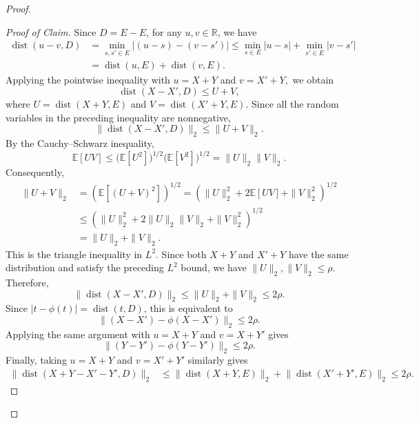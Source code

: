 \documentclass[11pt]{article}
\numberwithin{equation}{section}
\theoremstyle{definition}
\theoremstyle{remark}
\begin{document}
\begin{proof}
\begin{proof}[Proof of Claim]
Since $D=E-E$, for any $u,v\in\mathbb R$, we have
$$
\begin{aligned}
\operatorname{dist}(u-v,D)
&=\min_{s,s'\in E}|(u-s)-(v-s')|\leq
\min_{s\in E}|u-s|+\min_{s'\in E}|v-s'|\\
&=\operatorname{dist}(u,E)+\operatorname{dist}(v,E).
\end{aligned}
$$
Applying the pointwise inequality with
$
u=X+Y
$
and
$
v=X'+Y,
$
we obtain
$$
\operatorname{dist}(X-X',D)\leq U+V,
$$
where
$
U=\operatorname{dist}(X+Y,E)$ and
$V=\operatorname{dist}(X'+Y,E).$
Since all the random variables in the preceding inequality are
nonnegative,
$$
\bigl\|\operatorname{dist}(X-X',D)\bigr\|_2
\leq\|U+V\|_2.
$$
By the Cauchy--Schwarz inequality,
$$
\mathbb E[UV]\leq
\bigl(\mathbb E[U^2]\bigr)^{1/2}
\bigl(\mathbb E[V^2]\bigr)^{1/2}
=\|U\|_2\|V\|_2.
$$
Consequently,
$$
\begin{aligned}
\|U+V\|_2
&=\left(\mathbb E[(U+V)^2]\right)^{1/2}=\left(
\|U\|_2^2+2\mathbb E[UV]+\|V\|_2^2
\right)^{1/2}\\
&\leq
\left(
\|U\|_2^2+2\|U\|_2\|V\|_2+\|V\|_2^2
\right)^{1/2}\\
&=\|U\|_2+\|V\|_2.
\end{aligned}
$$
This is the triangle inequality in $L^2$.
Since both $X+Y$ and $X'+Y$ have the same distribution and satisfy
the preceding $L^2$ bound, we have $\|U\|_2,\|V\|_2\leq\rho$.
Therefore,
$$
\bigl\|\operatorname{dist}(X-X',D)\bigr\|_2
\leq\|U\|_2+\|V\|_2
\leq2\rho.
$$
Since $|t-\phi(t)|=\operatorname{dist}(t,D)$, 
this is equivalent to
$$
\bigl\|(X-X')-\phi(X-X')\bigr\|_2\leq2\rho.
$$
Applying the same argument with
$
u=X+Y$ and $v=X+Y'
$
gives
$$
\bigl\|(Y-Y')-\phi(Y-Y')\bigr\|_2\leq2\rho.
$$
Finally, taking
$
u=X+Y$ and $ v=X'+Y'$
similarly  gives
$$
\begin{aligned}
\bigl\|\operatorname{dist}(X+Y-X'-Y',D)\bigr\|_2
&\leq
\bigl\|\operatorname{dist}(X+Y,E)\bigr\|_2
+\bigl\|\operatorname{dist}(X'+Y',E)\bigr\|_2\leq2\rho.
\end{aligned}
$$


\end{proof}
\end{proof}
\end{document}
